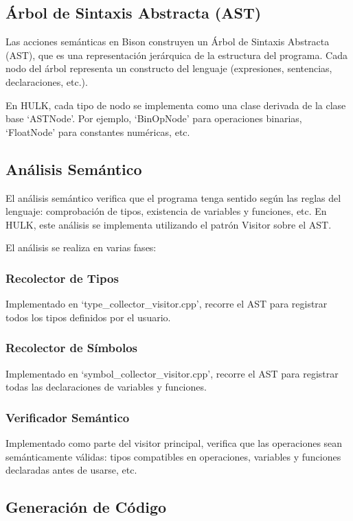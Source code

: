 \documentclass{article}
\begin{document}
\subsection{Árbol de Sintaxis Abstracta (AST)}

Las acciones semánticas en Bison construyen un Árbol de Sintaxis Abstracta (AST), que es una representación jerárquica de la estructura del programa. Cada nodo del árbol representa un constructo del lenguaje (expresiones, sentencias, declaraciones, etc.).

En HULK, cada tipo de nodo se implementa como una clase derivada de la clase base `ASTNode'. Por ejemplo, `BinOpNode' para operaciones binarias, `FloatNode' para constantes numéricas, etc.

\subsection{Análisis Semántico}

El análisis semántico verifica que el programa tenga sentido según las reglas del lenguaje: comprobación de tipos, existencia de variables y funciones, etc. En HULK, este análisis se implementa utilizando el patrón Visitor sobre el AST.

El análisis se realiza en varias fases:

\subsubsection{Recolector de Tipos}
Implementado en `type\_collector\_visitor.cpp', recorre el AST para registrar todos los tipos definidos por el usuario.

\subsubsection{Recolector de Símbolos}
Implementado en `symbol\_collector\_visitor.cpp', recorre el AST para registrar todas las declaraciones de variables y funciones.

\subsubsection{Verificador Semántico}
Implementado como parte del visitor principal, verifica que las operaciones sean semánticamente válidas: tipos compatibles en operaciones, variables y funciones declaradas antes de usarse, etc.

\subsection{Generación de Código}
\end{document}
